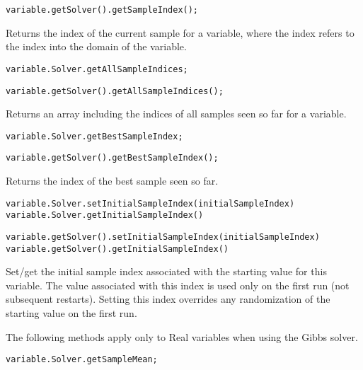 \ifjava
\begin{lstlisting}
variable.getSolver().getSampleIndex();
\end{lstlisting}
\fi

Returns the index of the current sample for a variable, where the index refers to the index into the domain of the variable.

\ifmatlab
\begin{lstlisting}
variable.Solver.getAllSampleIndices;
\end{lstlisting}
\fi

\ifjava
\begin{lstlisting}
variable.getSolver().getAllSampleIndices();
\end{lstlisting}
\fi

Returns an array including the indices of all samples seen so far for a variable.

\ifmatlab
\begin{lstlisting}
variable.Solver.getBestSampleIndex;
\end{lstlisting}
\fi

\ifjava
\begin{lstlisting}
variable.getSolver().getBestSampleIndex();
\end{lstlisting}
\fi

Returns the index of the best sample seen so far.


\ifmatlab
\begin{lstlisting}
variable.Solver.setInitialSampleIndex(initialSampleIndex)
variable.Solver.getInitialSampleIndex()
\end{lstlisting}
\fi

\ifjava
\begin{lstlisting}
variable.getSolver().setInitialSampleIndex(initialSampleIndex)
variable.getSolver().getInitialSampleIndex()
\end{lstlisting}
\fi

Set/get the initial sample index associated with the starting value for this variable.  The value associated with this index is used only on the first run (not subsequent restarts).  Setting this index overrides any randomization of the starting value on the first run.


The following methods apply only to Real variables when using the Gibbs solver.

\ifmatlab
\begin{lstlisting}
variable.Solver.getSampleMean;
\end{lstlisting}
\fi

